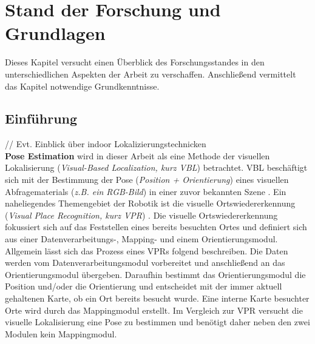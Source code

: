 \pagebreak
\section{Stand der Forschung und Grundlagen}

Dieses Kapitel versucht einen Überblick des Forschungsstandes in den unterschiedlichen Aspekten der Arbeit zu verschaffen. Anschließend vermittelt das Kapitel notwendige Grundkenntnisse.

\subsection{Einführung}



// Evt. Einblick über indoor Lokalizierungstechnicken \\

\textbf{Pose Estimation} wird in dieser Arbeit als eine Methode der visuellen Lokalisierung (\textit{Visual-Based Localization, kurz VBL}) betrachtet. VBL beschäftigt sich mit der Bestimmung der Pose (\textit{Position + Orientierung}) eines visuellen Abfragematerials (\textit{z.B. ein RGB-Bild}) in einer zuvor bekannten Szene  \cite{piascoSurveyVisualBasedLocalization2018}.
Ein naheliegendes Themengebiet der Robotik ist die visuelle Ortswiedererkennung (\textit{Visual Place Recognition, kurz VPR}) \cite{lowryVisualPlaceRecognition2016}. Die visuelle Ortswiedererkennung fokussiert sich auf das Feststellen eines bereits besuchten Ortes und definiert sich aus einer Datenverarbeitungs-, Mapping- und einem Orientierungsmodul. Allgemein lässt sich das Prozess eines VPRs \cite{lowryVisualPlaceRecognition2016} folgend beschreiben. Die Daten werden vom Datenverarbeitungsmodul vorbereitet und anschließend an das Orientierungsmodul übergeben. Daraufhin bestimmt das Orientierungsmodul die Position und/oder die Orientierung und entscheidet mit der immer aktuell gehaltenen Karte, ob ein Ort bereits besucht wurde. Eine interne Karte besuchter Orte wird durch das Mappingmodul erstellt. Im Vergleich zur VPR \cite{lowryVisualPlaceRecognition2016} versucht die visuelle Lokalisierung \cite{piascoSurveyVisualBasedLocalization2018} eine Pose zu bestimmen und benötigt daher neben den zwei Modulen kein Mappingmodul.


